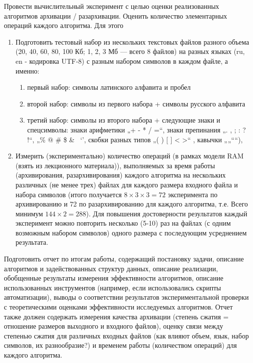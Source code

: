 \documentclass[a4paper, 12pt]{article}
\begin{document}
Провести вычислительный эксперимент с целью оценки реализованных
алгоритмов архивации / разархивации. Оценить количество элементарных операций
каждого алгоритма.
Для этого
\begin{enumerate}
  \item Подготовить тестовый набор из нескольких текстовых файлов разного объема
  (20, 40, 60, 80, 100 Кб; 1, 2, 3 Мб — всего 8 файлов) на разных языках (ru, en -
  кодировка UTF-8) с разным набором символов в каждом файле, а именно:
  \begin{enumerate}
    \item первый набор: символы латинского алфавита и пробел
    \item второй набор: символы из первого набора + символы русского алфавита
    \item третий набор: символы из второго набора + следующие знаки и
    спецсимволы: знаки арифметики „+ - * / =“, знаки препинания „. , ; : ? !“,
    „\% @ \# \$ & ~‘’, скобки разных типов „( ) [ ] { } < >“ , кавычки „„““),
  \end{enumerate}
  \item Измерить (экспериментально) количество операций (в рамках модели RAM (взять из
    лекционного материала)), выполняемых за время работы (архивирования,
    разархивирования) каждого алгоритма на нескольких различных (не менее
    трех) файлах для каждого размера входного файла и набора символов (итого
    получается $8\times3\times3 = 72$ эксперимента по архивированию и 72 по
    разархивированию для каждого алгоритма, т.е. Всего минимум $144\times2 = 288$).
    Для повышения достоверности результатов каждый эксперимент можно повторить
    несколько (5-10) раз на файлах (с одним возможным набором символов) одного размера с
    последующим усреднением результата.
\end{enumerate}

Подготовить отчет по итогам работы, содержащий постановку задачи, описание
алгоритмов и задействованных структур данных, описание реализации, обобщенные
результаты измерения эффективности алгоритмов, описание использованных
инструментов (например, если использовались скрипты автоматизации), выводы о
соответствии результатов экспериментальной проверки с теоретическими оценками
эффективности исследуемых алгоритмов.
Отчет также должен содержать измерения качества архивации (степень сжатия =
отношение размеров выходного и входного файлов), оценку связи между степенью
сжатия для различных входных файлов (как влияют объем, язык, набор символов, их
разнообразие?) и временем работы (количеством операций) для каждого алгоритма.
\end{document}
